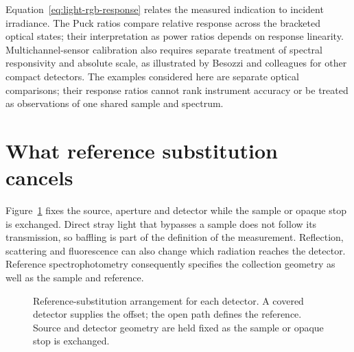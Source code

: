 Equation~\eqref{eq:light-rgb-response} relates the measured indication to incident irradiance. The Puck ratios compare relative response across the bracketed optical states; their interpretation as power ratios depends on response linearity. Multichannel-sensor calibration also requires separate treatment of spectral responsivity and absolute scale, as illustrated by Besozzi and colleagues for other compact detectors\cite{besozzi2026}. The examples considered here are separate optical comparisons; their response ratios cannot rank instrument accuracy or be treated as observations of one shared sample and spectrum.

\section{What reference substitution cancels}
Figure~\ref{fig:light-rgb-apparatus} fixes the source, aperture and detector while the sample or opaque stop is exchanged. Direct stray light that bypasses a sample does not follow its transmission, so baffling is part of the definition of the measurement. Reflection, scattering and fluorescence can also change which radiation reaches the detector. Reference spectrophotometry consequently specifies the collection geometry as well as the sample and reference\cite{BurkeMavrodineanu1983}.

\begin{figure}[!htbp]
\centering
{}
\caption{Reference-substitution arrangement for each detector. A covered detector supplies the offset; the open path defines the reference. Source and detector geometry are held fixed as the sample or opaque stop is exchanged.}
\label{fig:light-rgb-apparatus}
\end{figure}

